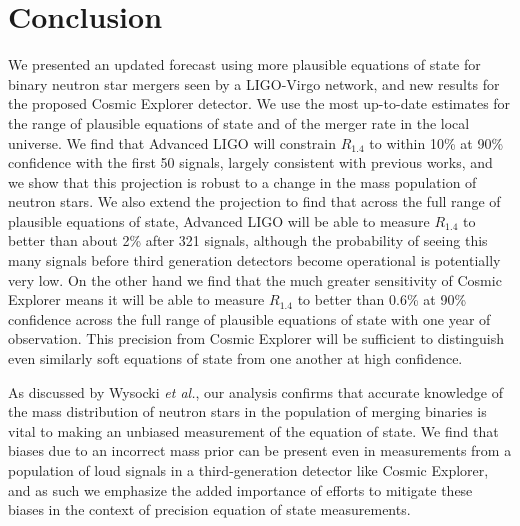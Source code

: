 \section{Conclusion}\label{sec:eos_meas_conclusion}
We  presented an updated forecast using more plausible equations of state for  binary neutron star mergers seen  by a LIGO-Virgo network, and new results for the proposed Cosmic Explorer detector. We use the most up-to-date estimates for the range of plausible equations of state and of the merger rate in the local universe. We find that Advanced LIGO will constrain $R_{1.4}$ to within 10\% at 90\% confidence with the first 50 signals, largely consistent with previous works, and we show that this projection is robust to a change in the mass population of neutron stars. We also extend the projection to find that across the full range of plausible equations of state, Advanced LIGO will be able to measure $R_{1.4}$ to better than about 2\% after 321 signals, although the probability of seeing this many signals before third generation detectors become operational is potentially  very low. On the other hand we find that the much greater sensitivity of Cosmic Explorer means it will be able to measure $R_{1.4}$ to better than 0.6\% at 90\% confidence across the full range of plausible equations of state with one year of observation. This precision from Cosmic Explorer will be sufficient to distinguish even similarly soft equations of state from one another at high confidence.

As discussed by Wysocki {\it et al.}, our analysis confirms that accurate knowledge of the mass distribution of neutron stars in the population of merging binaries is vital to making an unbiased measurement of the equation of state. We find that biases due to an incorrect mass prior can be present even in measurements from a population of loud signals in a third-generation detector like Cosmic Explorer, and as such we emphasize the added importance of efforts to mitigate these biases in the context of precision equation of state measurements.



